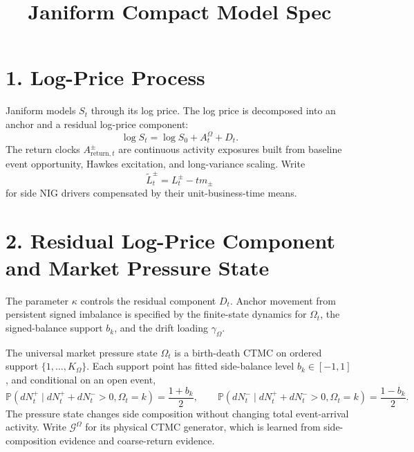 \documentclass[11pt]{article}
\title{Janiform Compact Model Spec}
\author{}
\date{}
\begin{document}
    \maketitle

    \section*{1. Log-Price Process}
    Janiform models \(S_t\) through its log price.
    The log price is decomposed into an anchor and a residual log-price
    component:
    \[
        \log S_t=\log S_0+A_t^\Omega+D_t.
    \]
    The return clocks \(A_{\mathrm{return},t}^\pm\) are continuous activity
    exposures built from baseline event opportunity, Hawkes excitation, and
    long-variance scaling.
    Write
    \[
        \widetilde L_t^\pm=L_t^\pm-tm_\pm
    \]
    for side NIG drivers compensated by their unit-business-time means.

    \section*{2. Residual Log-Price Component and Market Pressure State}
    The parameter \(\kappa\) controls the residual component \(D_t\).
    Anchor movement from persistent signed imbalance is specified by the
    finite-state dynamics for \(\Omega_t\), the signed-balance support
    \(b_k\), and the drift loading \(\gamma_\Omega\).

    The universal market pressure state \(\Omega_t\) is a birth-death CTMC on
    ordered support \(\{1,\ldots,K_\Omega\}\).
    Each support point has fitted side-balance level \(b_k\in[-1,1]\), and
    conditional on an open event,
    \[
        \mathbb P(dN_t^+\mid dN_t^++dN_t^->0,\Omega_t=k)
        =
        \frac{1+b_k}{2},
        \qquad
        \mathbb P(dN_t^-\mid dN_t^++dN_t^->0,\Omega_t=k)
        =
        \frac{1-b_k}{2}.
    \]
    The pressure state changes side composition without changing total
    event-arrival activity.
    Write \(\mathcal G^\Omega\) for its physical CTMC generator, which is
    learned from side-composition evidence and coarse-return evidence.
\end{document}
